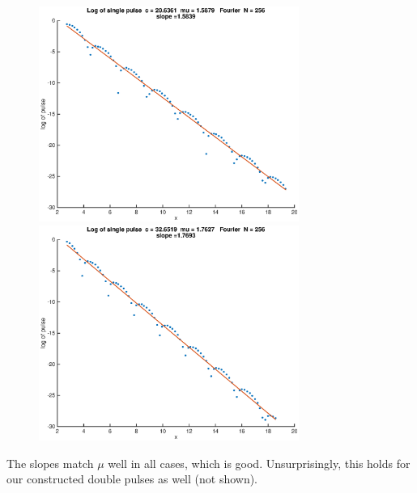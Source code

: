 \documentclass[12pt]{article}
\begin{document}
\begin{figure}[H]
\includegraphics[width=8.5cm]{logsingle206.eps}
\includegraphics[width=8.5cm]{logsingle326.eps}
\end{figure}

The slopes match $\mu$ well in all cases, which is good. Unsurprisingly, this holds for our constructed double pulses as well (not shown).
\end{document}
